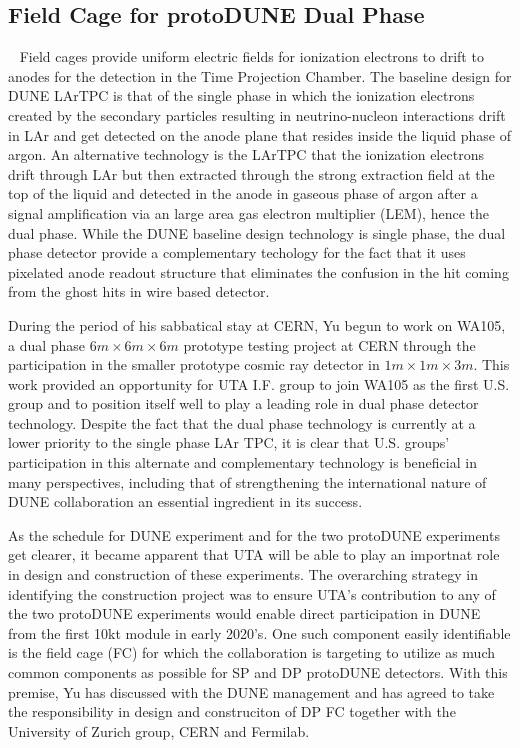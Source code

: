 \subsection{Field Cage for protoDUNE Dual Phase}~\label{sec:proto-dune-dp-fc}
Field cages provide uniform electric fields for ionization electrons to drift to anodes for the detection in the Time Projection Chamber.
The baseline design for DUNE LArTPC is that of the single phase in which the ionization electrons created by the secondary particles 
resulting in neutrino-nucleon interactions drift in LAr and get detected on the anode plane that resides inside the liquid phase of argon.  An alternative technology is the LArTPC that the ionization electrons drift through LAr but then extracted through the strong extraction field at the top of the liquid and detected in the anode in gaseous phase of argon after a signal amplification via an large area gas electron multiplier (LEM), hence the dual phase.  While the DUNE baseline design technology is single phase, the dual phase detector provide a complementary techology for the fact that it uses pixelated anode readout structure that eliminates the confusion in the hit coming from the ghost hits in wire based detector.

During the period of his sabbatical stay at CERN, Yu begun to work on WA105, a dual phase $6m\times 6m\times 6m$ prototype testing project at CERN through the participation in the smaller prototype cosmic ray detector in $1m\times 1m\times 3m$.  This work provided an opportunity for UTA I.F. group to join WA105 as the first U.S. group and to position itself well to play a leading role in dual phase detector technology.   Despite the fact that the dual phase technology is currently at a lower priority to the single phase LAr TPC, it is clear that U.S. groups' participation in this alternate and complementary technology is beneficial in many perspectives, including that of strengthening the international nature of DUNE collaboration an essential ingredient in its success.

As the schedule for DUNE experiment and for the two protoDUNE experiments get clearer, it became apparent that UTA will be able to play an importnat role in design and construction of these experiments.   The overarching strategy in identifying the construction project was to ensure UTA's contribution to any of the two protoDUNE experiments would enable direct participation in DUNE from the first 10kt module in early 2020's.  One such component easily identifiable is the field cage (FC) for which the collaboration is targeting to utilize as much common components as possible for SP and DP protoDUNE detectors.  With this premise, Yu has discussed with the DUNE management and has agreed to take the responsibility in design and construciton of DP FC together with the University of Zurich group, CERN and Fermilab.

